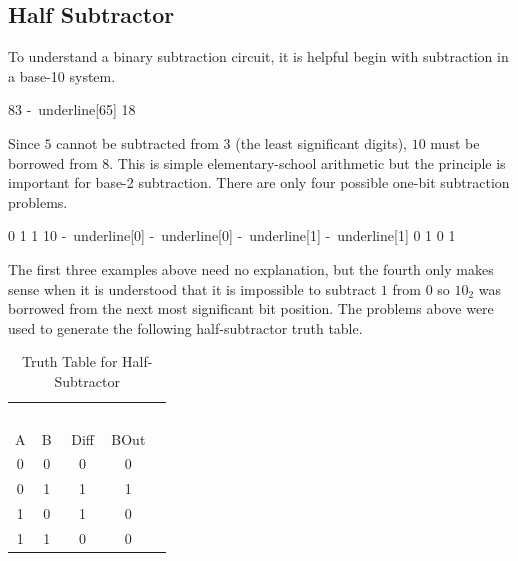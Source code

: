 \subsection{Half Subtractor}
\label{CL:subsec:half_subtractor}

To understand a binary subtraction circuit, it is helpful begin with subtraction in a base-10 system.  

\begin{binDisp}[commandchars=~\[\]]
     83
    -~underline[65]
     18
\end{binDisp}

Since $ 5 $ cannot be subtracted from $ 3 $ (the least significant digits), $ 10 $ must be borrowed from $ 8 $. This is simple elementary-school arithmetic but the principle is important for base-2 subtraction. There are only four possible one-bit subtraction problems.

\begin{binDisp}[commandchars=~\[\]]
     0     1     1     10
    -~underline[0]    -~underline[0]    -~underline[1]     -~underline[1]
     0     1     0      1
\end{binDisp}

The first three examples above need no explanation, but the fourth only makes sense when it is understood that it is impossible to subtract $ 1 $ from $ 0 $ so $ 10_{2} $ was borrowed from the next most significant bit position. The problems above were used to generate the following half-subtractor truth table.

\begin{table}[H]
	\sffamily
	\newcommand{\head}[1]{\textcolor{white}{\textbf{#1}}}    
	\begin{center}
		\begin{tabular}{ccc|cc} 
			\rowcolor{black!75}
			\multicolumn{2}{c}{\head{Inputs}} & \multicolumn{2}{c}{\head{Outputs}} \\
			A & B & Diff & BOut \\
			\hline
			0 & 0 & 0 & 0 \\
			0 & 1 & 1 & 1 \\
			1 & 0 & 1 & 0 \\
			1 & 1 & 0 & 0
		\end{tabular}
	\end{center}
	\caption{Truth Table for Half-Subtractor}
	\label{CL:tab:truth_table_for_half_subtractor}
\end{table}

